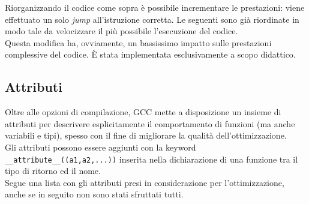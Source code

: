 Riorganizzando il codice come sopra è possibile incrementare le prestazioni: 
viene effettuato un solo \emph{jump} all'istruzione corretta. Le seguenti sono 
già riordinate in modo tale da velocizzare il più possibile l'esecuzione del 
codice.\\

Questa modifica ha, ovviamente, un bassissimo impatto sulle prestazioni 
complessive del codice. \`E stata implementata esclusivamente a scopo didattico.

\subsection{Attributi}
Oltre alle opzioni di compilazione, GCC mette a disposizione un insieme di   
attributi per descrivere esplicitamente il comportamento di funzioni (ma anche 
variabili e tipi), spesso con il fine di migliorare la qualità 
dell'ottimizzazione.\\
Gli attributi possono essere aggiunti con la keyword 
\verb|__attribute__((a1,a2,...))| inserita nella dichiarazione di una funzione 
tra il tipo di ritorno ed il nome.\\
Segue una lista con gli attributi presi in considerazione 
per l'ottimizzazione, anche se in seguito non sono stati sfruttati tutti.
 
